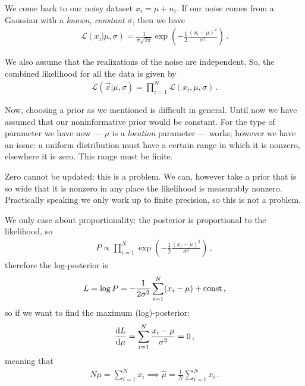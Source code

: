 \documentclass[main.tex]{subfiles}
\begin{document}

We come back to our noisy dataset \(x_i = \mu + n_i\). 
If our noise comes from a Gaussian with a \emph{known}, \emph{constant} \(\sigma \), then we have 
%
\begin{align}
\mathscr{L}(x_i | \mu , \sigma )
= \frac{1}{\sigma \sqrt{2 \pi }} 
\exp(- \frac{1}{2} \frac{(x_i - \mu )^2}{\sigma^2})
\,.
\end{align}

We also assume that the realizations of the noise are independent. 
So, the combined likelihood for all the data is given by 
%
\begin{align}
\mathscr{L}(\vec{x} | \mu , \sigma ) = \prod_{i=1}^{N} \mathscr{L}(x_i, \mu , \sigma )
\,.
\end{align}

Now, choosing a prior as we mentioned is difficult in general. Until now we have assumed that our noninformative prior would be constant. 
For the type of parameter we have now --- \(\mu \) is a \emph{location} parameter --- works; however we have an issue: a uniform distribution must have a certain range in which it is nonzero, elsewhere it is zero. 
This range must be finite.
 
Zero cannot be updated: this is a problem.
We can, however take a prior that is so wide that it is nonzero in any place the likelihood is measurably nonzero. Practically speaking we only work up to finite precision, so this is not a problem. 

We only case about proportionality: the posterior is proportional to the likelihood, so
%
\begin{align}
P \propto \prod_{i=1}^{N} \exp(- \frac{1}{2} \frac{(x_i - \mu )^2}{\sigma^2})
\,,
\end{align}
%
therefore the log-posterior is 
%
\begin{align}
L = \log P = - \frac{1}{2 \sigma^2} \sum _{i=1}^{N} (x_i - \mu ) + \text{const}
\,,
\end{align}
%
so if we want to find the maximum (log)-posterior: 
%
\begin{align}
\dv{L}{\mu }  = \sum_{i=1}^{N} \frac{x_i- \mu }{\sigma^2}  =0 
\,,
\end{align}
%
meaning that 
%
\begin{align}
N \mu = \sum_{i=1}^{N} x_i \implies \hat{\mu} = \frac{1}{N} \sum_{i=1}^{N} x_i
\,.
\end{align}
\end{document}
